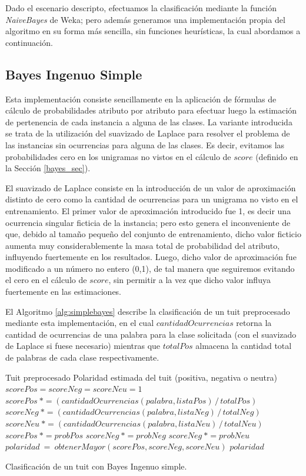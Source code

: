 Dado el escenario descripto, efectuamos la clasificaci\'on mediante la funci\'on \textit{NaiveBayes} de Weka; pero adem\'as generamos una implementaci\'on propia del algoritmo en su forma m\'as sencilla, sin funciones heur\'isticas, la cual abordamos a continuaci\'on. 

\subsection{Bayes Ingenuo Simple}

Esta implementaci\'on consiste sencillamente en la aplicaci\'on de f\'ormulas de c\'alculo de probabilidades atributo por atributo para efectuar luego la estimaci\'on de pertenencia de cada instancia a alguna de las clases. La variante introducida se trata de la utilizaci\'on del suavizado de Laplace para resolver el problema de las instancias sin ocurrencias para alguna de las clases. Es decir, evitamos las probabilidades cero en los unigramas no vistos en el c\'alculo de $score$ (definido en la Secci\'on \ref{bayes_sec}).
\newline

El suavizado de Laplace consiste en la introducci\'on de un valor de aproximaci\'on distinto de cero como la cantidad de ocurrencias para un unigrama no visto en el entrenamiento. El primer valor de aproximaci\'on introducido fue 1, es decir una ocurrencia singular ficticia de la instancia; pero esto genera el inconveniente de que, debido al tama\~no peque\~no del conjunto de entrenamiento, dicho valor ficticio aumenta muy considerablemente la masa total de probabilidad del atributo, influyendo fuertemente en los resultados. Luego, dicho valor de aproximaci\'on fue modificado a un n\'umero no entero (0,1), de tal manera que seguiremos evitando el cero en el c\'alculo de $score$, sin permitir a la vez que dicho valor influya fuertemente en las estimaciones.
\newline

El Algoritmo \ref{alg:simplebayes} describe la clasificaci\'on de un tuit preprocesado mediante esta implementaci\'on, en el cual $cantidadOcurrencias$ retorna la cantidad de ocurrencias de una palabra para la clase solicitada (con el suavizado de Laplace si fuese necesario) mientras que $totalPos$ almacena la cantidad total de palabras de cada clase respectivamente.

\begin{algorithm}
\begin{algorithmic}
\REQUIRE Tuit preprocesado
\ENSURE Polaridad estimada del tuit (positiva, negativa o neutra)
\STATE $scorePos = scoreNeg = scoreNeu = 1$ 
\STATE $scorePos \ *= (cantidadOcurrencias(palabra, listaPos) \, / \, totalPos)$
\STATE $scoreNeg \ *= (cantidadOcurrencias(palabra, listaNeg) \, / \, totalNeg)$
\STATE $scoreNeu \ *= (cantidadOcurrencias(palabra, listaNeu) \, / \, totalNeu)$
\ENDFOR
\STATE $scorePos \ *= probPos$
\STATE $scoreNeg \ *= probNeg$
\STATE $scoreNeg \ *= probNeu$
\STATE $polaridad \ = \ obtenerMayor(scorePos,scoreNeg,scoreNeu)$
\RETURN $polaridad$
\end{algorithmic}
\caption{Clasificaci\'on de un tuit con Bayes Ingenuo simple.}
\label{alg:simplebayes}
\end{algorithm}

